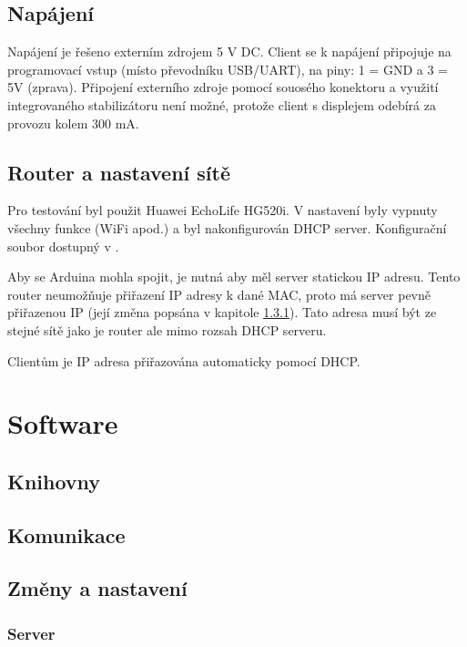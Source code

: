 \documentclass[a4paper,12pt, twoside]{article} %
\begin{document}
\subsection{Napájení}
\label{sec:napajeni}
Napájení je řešeno externím zdrojem 5 V DC. Client se k napájení připojuje na programovací vstup (místo převodníku USB/UART), na piny: 1 = GND a 3 = 5V (zprava). Připojení externího zdroje pomocí souosého konektoru a využití integrovaného stabilizátoru není možné, protože client s displejem odebírá za provozu kolem 300 mA. 
\subsection{Router a nastavení sítě}
\label{sec:router}
Pro testování byl použit Huawei EchoLife HG520i. V nastavení byly vypnuty všechny funkce (WiFi apod.) a byl nakonfigurován DHCP server. Konfigurační soubor dostupný v \cite{router_config}.

Aby se Arduina mohla spojit, je nutná aby měl server statickou IP adresu. Tento router neumožňuje přiřazení IP adresy k dané MAC, proto má server pevně přiřazenou IP (její změna popsána v kapitole \ref{sec:nastaveni_server}). Tato adresa musí být ze stejné sítě jako je router ale mimo rozsah DHCP serveru.

Clientům je IP adresa přiřazována automaticky pomocí DHCP.
\section{Software}
\subsection{Knihovny}
\label{sec:knihovny}
\subsection{Komunikace}
\label{sec:komunikace_server_client}
\subsection{Změny a nastavení}
\subsubsection{Server}
\label{sec:nastaveni_server}
\clearpage
\end{document}
